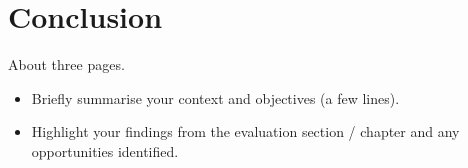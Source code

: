 \chapter{Conclusion}
About three pages.

\begin{itemize}
\item Briefly summarise your context and objectives (a few lines).
\item Highlight your findings from the evaluation section / chapter and any opportunities identified.
\end{itemize}



